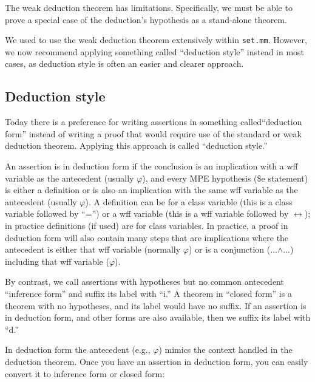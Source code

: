 The weak deduction theorem has limitations.
Specifically, we must be able to prove a special case of the deduction's
hypothesis as a stand-alone theorem.

We used to use the weak deduction theorem
extensively within \texttt{set.mm}.
However, we now recommend applying something called ``deduction style''
instead in most cases, as deduction style is
often an easier and clearer approach.

\subsection{Deduction style}

Today there is a preference for writing assertions in
something called``deduction form''
instead of writing a proof that would require use of the standard or
weak deduction theorem. Applying this approach is called
``deduction style.''

An assertion is in deduction form%
if the conclusion is an implication with
a wff variable as the antecedent (usually $\varphi$), and every MPE hypothesis
(\$e statement) is either a definition or is also an implication with
the same wff variable as the antecedent (usually $\varphi$). A definition
can be for a class variable (this is a class variable followed by ``='')
or a wff variable (this is a wff variable followed by $\leftrightarrow$);
in practice
definitions (if used) are for class variables. In practice, a proof
in deduction form will also contain many steps that are implications
where the antecedent is either that wff variable (normally $\varphi$)
or is
a conjunction (...$\land$...) including that wff variable ($\varphi$).

By contrast, we call assertions with hypotheses
but no common antecedent ``inference form''%
and suffix its label with ``i.''
A theorem in ``closed form''%
is a theorem with no hypotheses,
and its label would have no suffix.
If an assertion is in deduction form, and other forms are also available,
then we suffix its label with ``d.''

In deduction form the antecedent (e.g., $\varphi$) mimics the context handled
in the deduction theorem.
Once you have an assertion in deduction form, you can easily convert it
to inference form or closed form:

